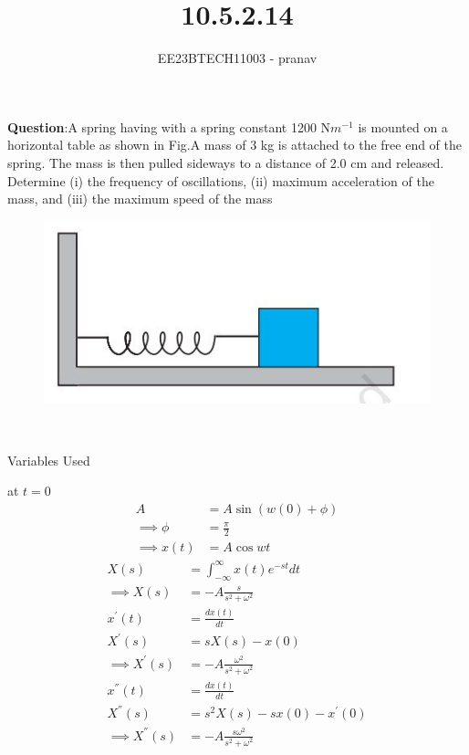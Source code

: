 \documentclass[journal,12pt,twocolumn]{IEEEtran}
\theoremstyle{remark}
\begin{document}

\vspace{3cm}

\title{10.5.2.14}
\author{EE23BTECH11003 - pranav}
\maketitle
\newpage

\bigskip
\renewcommand{\thefigure}{\arabic{figure}}
\renewcommand{\thetable}{\arabic{table}}

\textbf{Question}:A spring having with a spring constant 1200 N$m^{-1}$ is mounted on a horizontal
table as shown in Fig.A mass of 3 kg is attached to the free end of the
spring. The mass is then pulled sideways to a distance of 2.0 cm and released.\\
Determine (i) the frequency of oscillations, (ii) maximum acceleration of the mass,
and (iii) the maximum speed of the mass
\begin{figure}[h!]
    \centering
    \includegraphics[width=0.5\linewidth]{figs/figure.jpg}
    \caption{ }
    
\end{figure}\\
\solution
\begin{table}[h!]
    \centering
    
    \caption{Variables Used}
\end{table}
at $t=0$
\begin{align}
A&=A\sin{(w(0)+\phi)}\\
\implies \phi&=\frac{\pi}{2}\\
\implies x(t)&=A\cos{wt} 
\end{align}
\begin{align}
X(s)&=\int_{-\infty}^{\infty} x(t)e^{-st}dt \\
\implies X(s)&=-A\frac{s}{s^2+\omega^2}\\
x^{'}(t)&=\frac{dx(t)}{dt}\\
X^{'}(s)&=sX(s)-x(0)\\
\implies X^{'}(s)&=-A\frac{\omega^2}{s^2+\omega^2}\\
x^{''}(t)&=\frac{dx(t)}{dt}\\
X^{''}(s)&=s^2X(s)-sx(0)-x^{'}(0)\\
\implies X^{''}(s)&=-A\frac{s\omega^2}{s^2+\omega^2}
\end{align}
\end{document}
